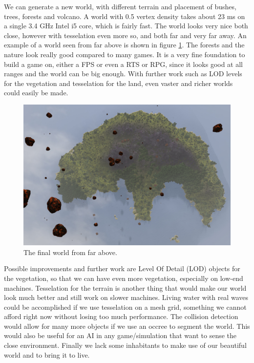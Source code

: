 We can generate a new world, with different terrain and placement of bushes, trees, forests and volcano. A world with 0.5 vertex density takes about 23 ms on a single 3.4 GHz Intel i5 core, which is fairly fast. The world looks very nice both close, however with tesselation even more so, and both far and very far away. An example of a world seen from far above is shown in figure \ref{fig:worldFromFarAbove}. The forests and the nature look really good compared to many games. It is a very fine foundation to build a game on, either a FPS or even a RTS or RPG, since it looks good at all ranges and the world can be big enough. With further work such as LOD levels for the vegetation and tesselation for the land, even vaster and richer worlds could easily be made.
\begin{figure}[H]
  \centering
  \includegraphics[width=\linewidth]{images/worldFromAFarTop.jpg}
  \caption{The final world from far above.}
  \label{fig:worldFromFarAbove}
\end{figure}%

Possible improvements and further work are Level Of Detail (LOD) objects for the vegetation, so that we can have even more vegetation, especially on low-end machines. Tesselation for the terrain is another thing that would make our world look much better and still work on slower machines. Living water with real waves could be accomplished if we use tesselation on a mesh grid, something we cannot afford right now without losing too much performance. The collision detection would allow for many more objects if we use an occree to segment the world. This would also be useful for an AI in any game/simulation that want to sense the close environment. Finally we lack some inhabitants to make use of our beautiful world and to bring it to live.

















